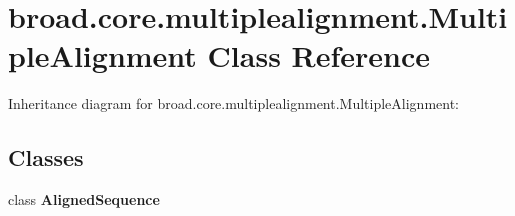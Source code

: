 \hypertarget{classbroad_1_1core_1_1multiplealignment_1_1_multiple_alignment}{\section{broad.\+core.\+multiplealignment.\+Multiple\+Alignment Class Reference}
\label{classbroad_1_1core_1_1multiplealignment_1_1_multiple_alignment}
}


Inheritance diagram for broad.\+core.\+multiplealignment.\+Multiple\+Alignment\+:
\subsection*{Classes}
\begin{DoxyCompactItemize}
\item 
class {\bfseries Aligned\+Sequence}
\end{DoxyCompactItemize}
